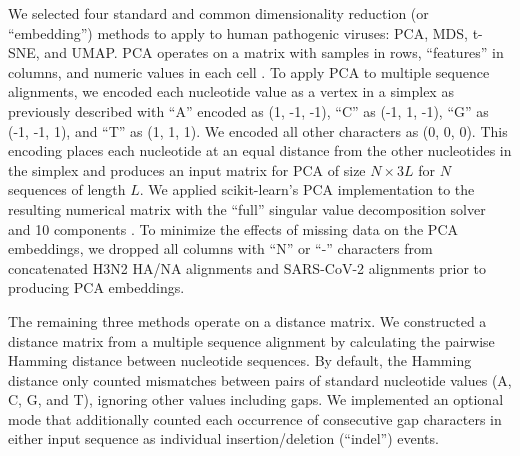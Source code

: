 \documentclass[webpdf,contemporary,large,single]{oup-authoring-template}%
\theoremstyle{thmstyleone}%
\theoremstyle{thmstyletwo}%
\theoremstyle{thmstylethree}%
\begin{document}
We selected four standard and common dimensionality reduction (or ``embedding'') methods to apply to human pathogenic viruses: PCA, MDS, t-SNE, and UMAP.
PCA operates on a matrix with samples in rows, ``features'' in columns, and numeric values in each cell \citep{jolliffe_cadima_2016}.
To apply PCA to multiple sequence alignments, we encoded each nucleotide value as a vertex in a simplex as previously described \citep{Stormo2011} with ``A'' encoded as (1, -1, -1), ``C'' as (-1, 1, -1), ``G'' as (-1, -1, 1), and ``T'' as (1, 1, 1).
We encoded all other characters as (0, 0, 0).
This encoding places each nucleotide at an equal distance from the other nucleotides in the simplex and produces an input matrix for PCA of size $N \times 3L$ for $N$ sequences of length $L$.
We applied scikit-learn's PCA implementation to the resulting numerical matrix with the ``full'' singular value decomposition solver and 10 components \citep{Pedregosa2011}.
To minimize the effects of missing data on the PCA embeddings, we dropped all columns with ``N'' or ``-'' characters from concatenated H3N2 HA/NA alignments and SARS-CoV-2 alignments prior to producing PCA embeddings.

The remaining three methods operate on a distance matrix.
We constructed a distance matrix from a multiple sequence alignment by calculating the pairwise Hamming distance between nucleotide sequences.
By default, the Hamming distance only counted mismatches between pairs of standard nucleotide values (A, C, G, and T), ignoring other values including gaps.
We implemented an optional mode that additionally counted each occurrence of consecutive gap characters in either input sequence as individual insertion/deletion (``indel'') events.
\end{document}
